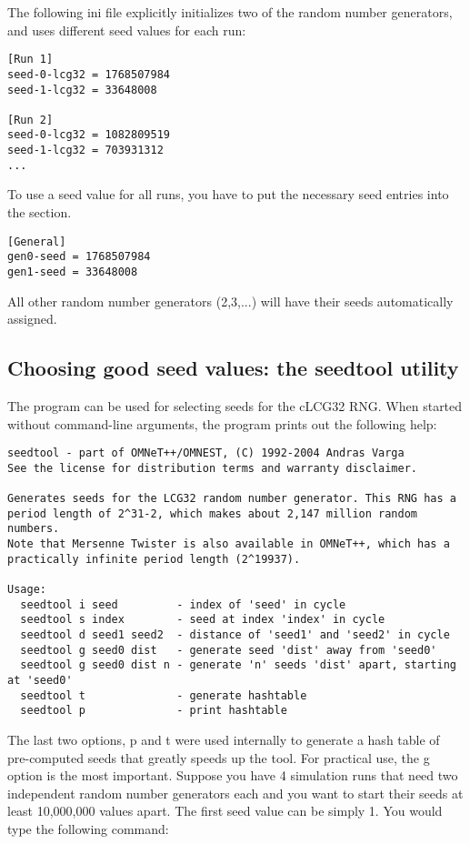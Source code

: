 The following ini file explicitly initializes two of the random
number generators, and uses different seed values for each run:

\begin{verbatim}
[Run 1]
seed-0-lcg32 = 1768507984
seed-1-lcg32 = 33648008

[Run 2]
seed-0-lcg32 = 1082809519
seed-1-lcg32 = 703931312
...
\end{verbatim}

To use a seed value for all runs, you have to put the necessary
seed entries into the \ttt{[General]} section.

\begin{verbatim}
[General]
gen0-seed = 1768507984
gen1-seed = 33648008
\end{verbatim}

All other random number generators (2,3,...) will have their seeds
automatically assigned.


\subsection{Choosing good seed values: the seedtool utility}
\label{sec:ch-run-sim:seedtool}

The  program can be used for selecting
seeds for the cLCG32 RNG. When started without command-line
arguments, the program prints out the following help:

\begin{verbatim}
seedtool - part of OMNeT++/OMNEST, (C) 1992-2004 Andras Varga
See the license for distribution terms and warranty disclaimer.

Generates seeds for the LCG32 random number generator. This RNG has a
period length of 2^31-2, which makes about 2,147 million random numbers.
Note that Mersenne Twister is also available in OMNeT++, which has a
practically infinite period length (2^19937).

Usage:
  seedtool i seed         - index of 'seed' in cycle
  seedtool s index        - seed at index 'index' in cycle
  seedtool d seed1 seed2  - distance of 'seed1' and 'seed2' in cycle
  seedtool g seed0 dist   - generate seed 'dist' away from 'seed0'
  seedtool g seed0 dist n - generate 'n' seeds 'dist' apart, starting at 'seed0'
  seedtool t              - generate hashtable
  seedtool p              - print hashtable
\end{verbatim}


The last two options, p and t were used internally to generate
a hash table of pre-computed seeds that greatly speeds up the
tool. For practical use, the g option is the most important.
Suppose you have 4 simulation runs that need two independent
random number generators each and you want to start their seeds
at least 10,000,000 values apart. The first seed value can be
simply 1. You would type the following command:

